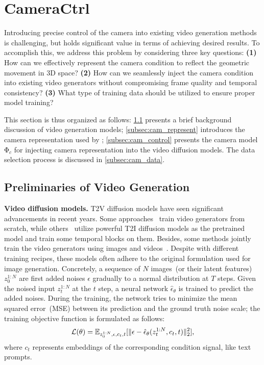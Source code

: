 \section{CameraCtrl}\label{sec:method}
Introducing precise control of the camera into existing video generation methods is challenging, but holds significant value in terms of achieving desired results. 
%
To accomplish this, we address this problem by considering three key questions:
\textbf{(1)} How can we effectively represent the camera condition to reflect the geometric movement in 3D space?
\textbf{(2)} How can we seamlessly inject the camera condition into existing video generators without compromising frame quality and temporal consistency?
\textbf{(3)} What type of training data should be utilized to ensure proper model training? 

This section is thus organized as follows: \cref{subsec:preliminary} presents a brief background discussion of video generation models; \cref{subsec:cam_represent} introduces the camera representation used by \method; \cref{subsec:cam_control} presents the camera model $\mathrm{\Phi}_c$ for injecting camera representation into the video diffusion models. The data selection process is discussed in \cref{subsec:cam_data}.
\subsection{Preliminaries of Video Generation}\label{subsec:preliminary}
\noindent \textbf{Video diffusion models.} T2V diffusion models have seen significant advancements in recent years. 
%
Some approaches~\citep{makeavideo, ho2022video} train video generators from scratch, while others~\citep{animatediff, alignyourlatents} utilize powerful T2I diffusion models as the pretrained model and train some temporal blocks on them. 
%
Besides, some methods jointly train the video generators using images and videos~\citep{yang2024cogvideox}.
%
Despite with different training recipes, these models often adhere to the original formulation used for image generation.
%
Concretely, a sequence of $N$ images~(or their latent features) $z_0^{1:N}$ are first added noises $\epsilon$ gradually to a normal distribution at $T$ steps. Given the noised input $z_t^{1:N}$ at the $t$ step, a neural network $\hat{\epsilon}_{\theta} $ is trained to predict the added noises.
%
During the training, the network tries to minimize the mean squared error~(MSE) between its prediction and the ground truth noise scale; the training objective function is formulated as follows:
\begin{equation}
	{\mathcal{L}}(\theta) = \mathbb{E}_{z_{0}^{1:N}, \epsilon, c_t , t}[\|\epsilon - \hat{\epsilon}_{\theta}(z_{t}^{1:N}, c_t, t)\|^2_2],
	\label{equ: t2v obj}
\end{equation}
where $c_{t}$ represents embeddings of the corresponding condition signal, like text prompts.

